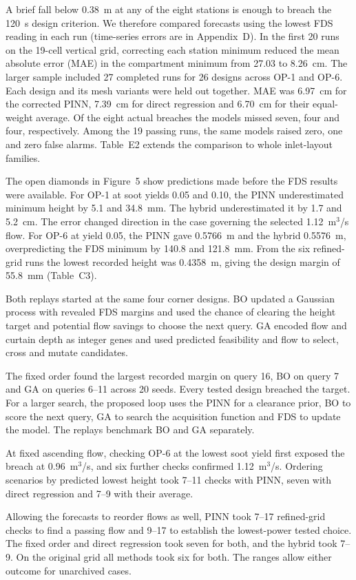A brief fall below 0.38~m at any of the eight stations is enough to breach the 120~s design criterion. We therefore compared forecasts using the lowest FDS reading in each run (time-series errors are in Appendix~D). In the first 20 runs on the 19-cell vertical grid, correcting each station minimum reduced the mean absolute error (MAE) in the compartment minimum from 27.03 to 8.26~cm. The larger sample included 27 completed runs for 26 designs across OP-1 and OP-6. Each design and its mesh variants were held out together. MAE was 6.97~cm for the corrected PINN, 7.39~cm for direct regression and 6.70~cm for their equal-weight average. Of the eight actual breaches the models missed seven, four and four, respectively. Among the 19 passing runs, the same models raised zero, one and zero false alarms. Table~E2 extends the comparison to whole inlet-layout families.

The open diamonds in Figure~5 show predictions made before the FDS results were available. For OP-1 at soot yields 0.05 and 0.10, the PINN underestimated minimum height by 5.1 and 34.8~mm. The hybrid underestimated it by 1.7 and 5.2~cm. The error changed direction in the case governing the selected 1.12~m$^3$/s flow. For OP-6 at yield 0.05, the PINN gave 0.5766~m and the hybrid 0.5576~m, overpredicting the FDS minimum by 140.8 and 121.8~mm. From the six refined-grid runs the lowest recorded height was 0.4358~m, giving the design margin of 55.8~mm (Table~C3).

Both replays started at the same four corner designs. BO updated a Gaussian process with revealed FDS margins and used the chance of clearing the height target and potential flow savings to choose the next query. GA encoded flow and curtain depth as integer genes and used predicted feasibility and flow to select, cross and mutate candidates.

The fixed order found the largest recorded margin on query 16, BO on query 7 and GA on queries 6--11 across 20 seeds. Every tested design breached the target. For a larger search, the proposed loop uses the PINN for a clearance prior, BO to score the next query, GA to search the acquisition function and FDS to update the model. The replays benchmark BO and GA separately.


At fixed ascending flow, checking OP-6 at the lowest soot yield first exposed the breach at 0.96~m$^3$/s, and six further checks confirmed 1.12~m$^3$/s. Ordering scenarios by predicted lowest height took 7--11 checks with PINN, seven with direct regression and 7--9 with their average.

Allowing the forecasts to reorder flows as well, PINN took 7--17 refined-grid checks to find a passing flow and 9--17 to establish the lowest-power tested choice. The fixed order and direct regression took seven for both, and the hybrid took 7--9. On the original grid all methods took six for both. The ranges allow either outcome for unarchived cases.
